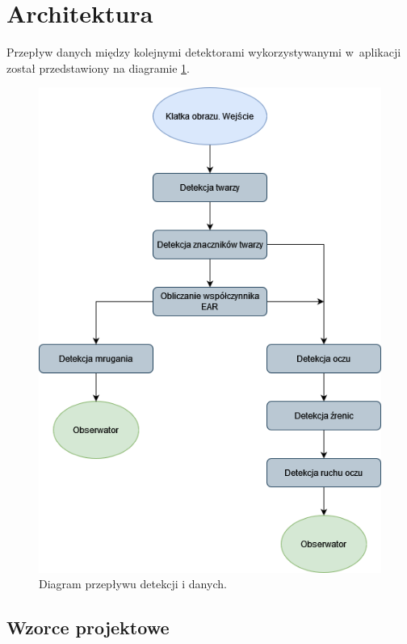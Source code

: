 \newpage
\section{Architektura}

Przepływ danych między kolejnymi detektorami wykorzystywanymi w~aplikacji został przedstawiony na diagramie \ref{fig:architecture}.

\begin{figure}[!h]
    \begin{center}
        \includegraphics[scale=0.5]{img/architecture.png}
        \caption{Diagram przepływu detekcji i danych.}
        \label{fig:architecture}
    \end{center}
\end{figure}



\subsection{Wzorce projektowe}

